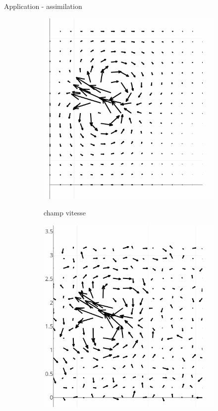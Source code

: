 \documentclass[aspectratio=169]{beamer} %
\begin{document}
\begin{frame}{Application - assimilation}
\begin{figure}[t]
\begin{subfigure}{0.3\textwidth}
            {\includegraphics[height=0.3\textheight]{../../conference/images/dipole_estimate/obs_no_noise/obs_no_noise-0.png}}
            \caption*{\tiny champ vitesse}
        \end{subfigure}
        \begin{subfigure}{0.3\textwidth}
            \centering
            {\includegraphics[height=0.3\textheight]{../../conference/images/dipole_estimate/obs_noise/obs_noise-0.png}}

\end{subfigure}
\end{figure}
\end{frame}
\end{document}
